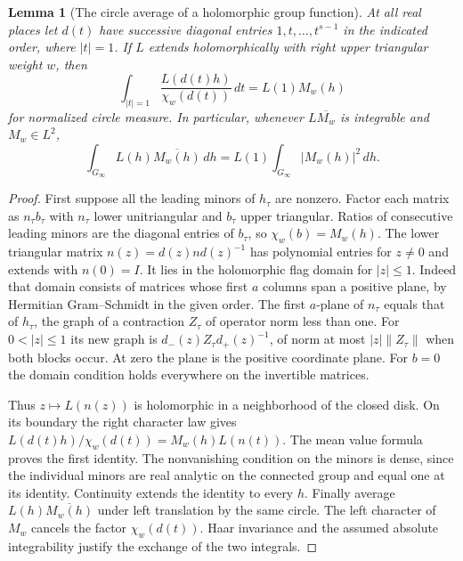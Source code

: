 \documentclass[a4paper,11pt]{article}
\newtheorem{lemma}[proposition]{Lemma}
\theoremstyle{definition}
\theoremstyle{remark}
\numberwithin{equation}{section}
\begin{document}
\begin{lemma}[The circle average of a holomorphic group function]
\leavevmode\label{lem:flagmean818}
At all real places let \(d(t)\) have successive diagonal
entries \(1,t,\ldots,t^{s-1}\) in the indicated order,
where \(|t|=1\). If \(L\) extends holomorphically with
right upper triangular weight \(w\), then
\[
   \int_{|t|=1}\frac{L(d(t)h)}{\chi_w(d(t))}\,dt
         =L(1)M_w(h)
\]
for normalized circle measure. In particular, whenever
\(L\overline{M_w}\) is integrable and \(M_w\in L^2\),
\[
       \int_{G_\infty}L(h)\overline{M_w(h)}\,dh
               =L(1)\int_{G_\infty}|M_w(h)|^2\,dh .
\]
\end{lemma}
\begin{proof}
First suppose all the leading minors of \(h_\tau\) are
nonzero. Factor each matrix as \(n_\tau b_\tau\) with
\(n_\tau\) lower unitriangular and \(b_\tau\) upper
triangular. Ratios of consecutive leading minors are
the diagonal entries of \(b_\tau\), so \(\chi_w(b)=M_w(h)\).
The lower triangular matrix
\(n(z)=d(z)n d(z)^{-1}\) has polynomial entries for \(z\ne0\)
and extends with \(n(0)=I\). It lies in the holomorphic
flag domain for \(|z|\le1\). Indeed that domain consists
of matrices whose first \(a\) columns span a positive
plane, by Hermitian Gram--Schmidt in the given order.
The first \(a\)-plane of \(n_\tau\) equals that of \(h_\tau\),
the graph of a contraction \(Z_\tau\) of operator norm
less than one. For \(0<|z|\le1\) its new graph is
\(d_-(z)Z_\tau d_+(z)^{-1}\), of norm at most
\(|z|\|Z_\tau\|\) when both blocks occur. At zero the
plane is the positive coordinate plane. For \(b=0\)
the domain condition holds everywhere on the invertible
matrices.

Thus \(z\mapsto L(n(z))\) is holomorphic in a neighborhood
of the closed disk. On its boundary the right character
law gives \(L(d(t)h)/\chi_w(d(t))=M_w(h)L(n(t))\).
The mean value formula proves the first identity. The
nonvanishing condition on the minors is dense, since the
individual minors are real analytic on the connected group
and equal one at its identity. Continuity extends the
identity to every \(h\). Finally average \(L(h)\overline{M_w(h)}\)
under left translation by the same circle. The left
character of \(M_w\) cancels the factor \(\chi_w(d(t))\).
Haar invariance and the assumed absolute integrability
justify the exchange of the two integrals.
\end{proof}
\end{document}

